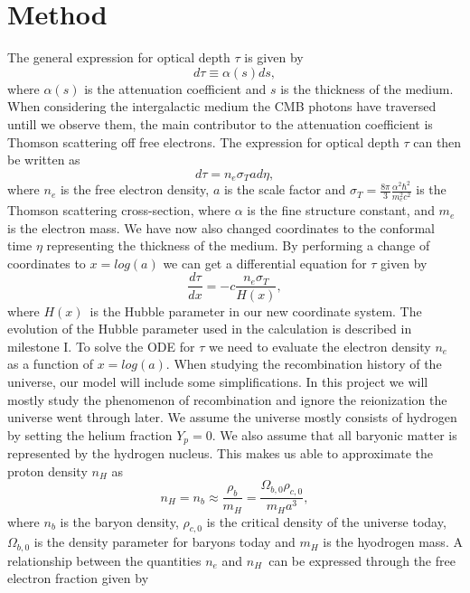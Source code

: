 \documentclass[onecolumn]{aastex62}
\begin{document}
\section{Method} \label{sec:method}
The general expression for optical depth $\tau$ is given by
\begin{equation}
    d\tau\equiv\alpha(s)ds,
\end{equation}
where $\alpha(s)$ is the attenuation coefficient and $s$ is the thickness of the medium. When considering the intergalactic medium the CMB photons have traversed untill we observe them, the main contributor to the attenuation coefficient is Thomson scattering off free electrons. The expression for optical depth $\tau$ can then be written as
\begin{equation}
    d\tau=n_e\sigma_T ad\eta,
\end{equation}
where $n_e$ is the free electron density, $a$ is the scale factor and $\sigma_T = \frac{8\pi}{3}\frac{\alpha^2\hbar^2}{m_e^2c^2}$ is the Thomson scattering cross-section, where $\alpha$ is the fine structure constant, and $m_e$ is the electron mass. We have now also changed coordinates to the conformal time $\eta$ representing the thickness of the medium. By performing a change of coordinates to $x=log(a)$ we can get a differential equation for $\tau$ given by
\begin{equation}\label{eq:optical_depth_of_x}
    \frac{d\tau}{dx} = -c\frac{n_e \sigma_T }{H(x)},
\end{equation}
where $H(x)$ is the Hubble parameter in our new coordinate system. The evolution of the Hubble parameter used in the calculation is described in milestone I. To solve the ODE for $\tau$ we need to evaluate the electron density $n_e$ as a function of $x=log(a)$. When studying the recombination history of the universe, our model will include some simplifications. In this project we will mostly study the phenomenon of recombination and ignore the reionization the universe went through later. We assume the universe mostly consists of hydrogen by setting the helium fraction $Y_p=0$. We also assume that all baryonic matter is represented by the hydrogen nucleus. This makes us able to approximate the proton density $n_H$ as
\begin{equation}\label{eq:baryondensity}
    n_H = n_b \approx \frac{\rho_b}{m_H} = \frac{\Omega_{b,0} \rho_{c,0}}{m_H a^3},
\end{equation}
where $n_b$ is the baryon density, $\rho_{c,0}$ is the critical density of the universe today, $\Omega_{b,0}$ is the density parameter for baryons today and $m_H$ is the hyodrogen mass. A relationship between the quantities $n_e$ and $n_H$ can be expressed through the free electron fraction given by
\end{document}
